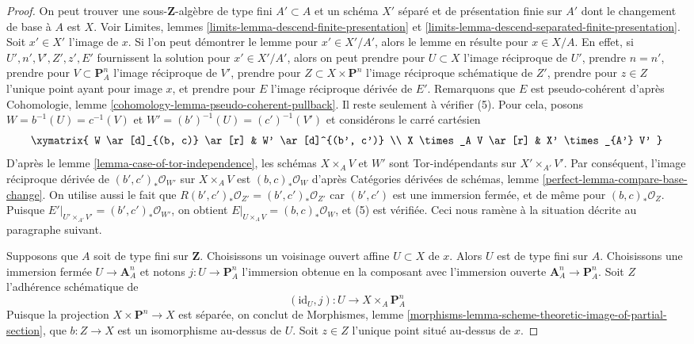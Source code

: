 \begin{proof}
On peut trouver une sous-$\mathbf{Z}$-algèbre de type fini $A' \subset A$
et un schéma $X'$ séparé et de présentation finie sur $A'$
dont le changement de base à $A$ est $X$. Voir
Limites, lemmes \ref{limits-lemma-descend-finite-presentation} et
\ref{limits-lemma-descend-separated-finite-presentation}.
Soit $x' \in X'$ l'image de $x$.
Si l'on peut démontrer le lemme pour $x' \in X'/A'$, alors
le lemme en résulte pour $x \in X/A$.
En effet, si $U', n', V', Z', z', E'$ fournissent la solution
pour $x' \in X'/A'$, alors on peut prendre pour
$U \subset X$ l'image réciproque de $U'$,
prendre $n = n'$,
prendre pour $V \subset \mathbf{P}^n_A$ l'image réciproque de $V'$,
prendre pour $Z \subset X \times \mathbf{P}^n$
l'image réciproque schématique de $Z'$,
prendre pour $z \in Z$ l'unique point ayant pour image $x$, et
prendre pour $E$ l'image réciproque dérivée de $E'$.
Remarquons que $E$ est pseudo-cohérent d'après
Cohomologie, lemme \ref{cohomology-lemma-pseudo-coherent-pullback}.
Il reste seulement à vérifier (5). Pour cela,
posons $W = b^{-1}(U) = c^{-1}(V)$ et $W' = (b')^{-1}(U) = (c')^{-1}(V')$ 
et considérons le carré cartésien
$$
\xymatrix{
W \ar[d]_{(b, c)} \ar[r] & W' \ar[d]^{(b', c')} \\
X \times_A V \ar[r] & X' \times_{A'} V'
}
$$
D'après le lemme \ref{lemma-case-of-tor-independence}, les schémas
$X \times_A V$ et $W'$ sont Tor-indépendants sur $X' \times_{A'} V'$.
Par conséquent, l'image réciproque dérivée de
$(b', c')_*\mathcal{O}_{W'}$ sur $X \times_A V$
est $(b, c)_*\mathcal{O}_W$ d'après
Catégories dérivées de schémas,
lemme \ref{perfect-lemma-compare-base-change}.
On utilise aussi le fait que $R(b', c')_*\mathcal{O}_{Z'} = (b', c')_*\mathcal{O}_{Z'}$
car $(b', c')$ est une immersion fermée, et de même pour
$(b, c)_*\mathcal{O}_Z$.
Puisque $E'|_{U' \times_{A'} V'} =
(b', c')_*\mathcal{O}_{W'}$, on obtient
$E|_{U \times_A V} = (b, c)_*\mathcal{O}_W$,
et (5) est vérifiée.
Ceci nous ramène à la situation décrite au
paragraphe suivant.

\medskip\noindent
Supposons que $A$ soit de type fini sur $\mathbf{Z}$.
Choisissons un voisinage ouvert affine $U \subset X$ de $x$.
Alors $U$ est de type fini sur $A$.
Choisissons une immersion fermée $U \to \mathbf{A}^n_A$ et notons
$j : U \to \mathbf{P}^n_A$ l'immersion obtenue en la composant
avec l'immersion ouverte $\mathbf{A}^n_A \to \mathbf{P}^n_A$.
Soit $Z$ l'adhérence schématique de
$$
(\text{id}_U, j) : U \longrightarrow X \times_A \mathbf{P}^n_A
$$
Puisque la projection $X \times \mathbf{P}^n \to X$ est séparée,
on conclut de Morphismes, lemme
\ref{morphisms-lemma-scheme-theoretic-image-of-partial-section},
que $b : Z \to X$ est un isomorphisme au-dessus de $U$.
Soit $z \in Z$ l'unique point situé au-dessus de $x$.


\end{proof}

